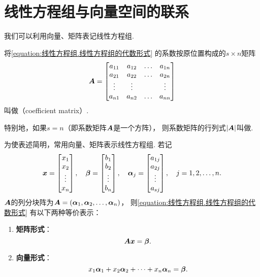 \section{线性方程组与向量空间的联系}
我们可以利用向量、矩阵表记线性方程组.

\begin{definition}
将\cref{equation:线性方程组.线性方程组的代数形式} 的系数按原位置构成的\(s \times n\)矩阵\begin{equation*}
	\boldsymbol{A} = \begin{bmatrix}
		a_{11} & a_{12} & \dots & a_{1n} \\
		a_{21} & a_{22} & \dots & a_{2n} \\
		\vdots & \vdots & & \vdots \\
		a_{n1} & a_{n2} & \dots & a_{nn}
	\end{bmatrix}
\end{equation*}叫做（coefficient matrix）.

特别地，如果\(s = n\)（即系数矩阵\(\boldsymbol{A}\)是一个方阵），
则系数矩阵的行列式\(\abs{\boldsymbol{A}}\)叫做.
\end{definition}

为使表述简明，常用向量、矩阵表示线性方程组.
若记\begin{equation*}
	\boldsymbol{x}=\begin{bmatrix}
		x_1 \\ x_2 \\ \vdots \\ x_n
	\end{bmatrix},
	\quad
	\boldsymbol\beta=\begin{bmatrix}
		b_1 \\ b_2 \\ \vdots \\ b_n
	\end{bmatrix},
	\quad
	\boldsymbol\alpha_j=\begin{bmatrix}
		a_{1j} \\ a_{2j} \\ \vdots \\ a_{sj}
	\end{bmatrix},
	\quad
	j=1,2,\dotsc,n.
\end{equation*}
\(\boldsymbol{A}\)的列分块阵为\(\boldsymbol{A} = (\boldsymbol\alpha_1,\boldsymbol\alpha_2,\dotsc,\boldsymbol\alpha_n)\)，
则\cref{equation:线性方程组.线性方程组的代数形式} 有以下两种等价表示：
\begin{enumerate}
	\item {\rm\bf 矩阵形式}：
	\begin{equation}
		\boldsymbol{A} \boldsymbol{x} = \boldsymbol\beta.
	\end{equation}
	\item {\rm\bf 向量形式}：
	\begin{equation}
		x_1 \boldsymbol\alpha_1 + x_2 \boldsymbol\alpha_2 + \dotsb + x_n \boldsymbol\alpha_n = \boldsymbol\beta.
	\end{equation}
\end{enumerate}
